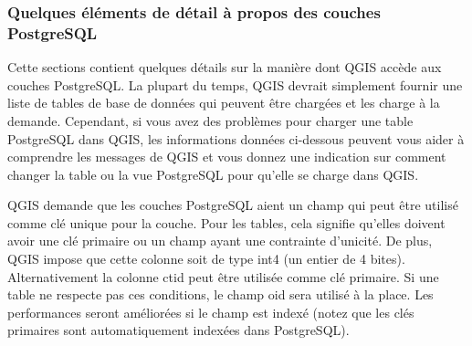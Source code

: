 \subsubsection{Quelques éléments de détail à propos des couches PostgreSQL}\label{sec:postgis_details}

Cette sections contient quelques détails sur la manière dont QGIS accède aux couches PostgreSQL. La plupart du temps, QGIS devrait simplement fournir une liste de tables de base de données qui peuvent être chargées et les charge à la demande. Cependant, si vous avez des problèmes pour charger une table PostgreSQL dans QGIS, les informations données ci-dessous peuvent vous aider à comprendre les messages de QGIS et vous donnez une indication sur comment changer la table ou la vue PostgreSQL pour qu'elle se charge dans QGIS.

QGIS demande que les couches PostgreSQL aient un champ qui peut être utilisé comme clé unique pour la couche. Pour les tables, cela signifie qu'elles doivent avoir une clé primaire ou un champ ayant une contrainte d'unicité. De plus, QGIS impose que cette colonne soit de type int4 (un entier de 4 bites). Alternativement la colonne ctid peut être utilisée comme clé primaire. Si une table ne respecte pas ces conditions, le champ oid sera utilisé à la place. Les performances seront améliorées si le champ est indexé (notez que les clés primaires sont automatiquement indexées dans PostgreSQL).

